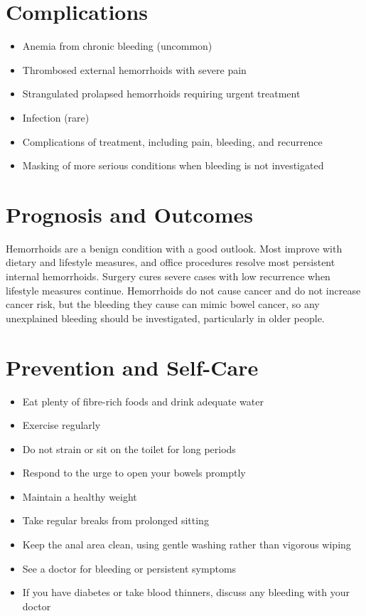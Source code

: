 \section*{Complications}
\begin{itemize}
    \item Anemia from chronic bleeding (uncommon)
    \item Thrombosed external hemorrhoids with severe pain
    \item Strangulated prolapsed hemorrhoids requiring urgent treatment
    \item Infection (rare)
    \item Complications of treatment, including pain, bleeding, and recurrence
    \item Masking of more serious conditions when bleeding is not investigated
\end{itemize}

\section*{Prognosis and Outcomes}
Hemorrhoids are a benign condition with a good outlook. Most improve with dietary and lifestyle measures, and office procedures resolve most persistent internal hemorrhoids. Surgery cures severe cases with low recurrence when lifestyle measures continue. Hemorrhoids do not cause cancer and do not increase cancer risk, but the bleeding they cause can mimic bowel cancer, so any unexplained bleeding should be investigated, particularly in older people.

\section*{Prevention and Self-Care}
\begin{itemize}
    \item Eat plenty of fibre-rich foods and drink adequate water
    \item Exercise regularly
    \item Do not strain or sit on the toilet for long periods
    \item Respond to the urge to open your bowels promptly
    \item Maintain a healthy weight
    \item Take regular breaks from prolonged sitting
    \item Keep the anal area clean, using gentle washing rather than vigorous wiping
    \item See a doctor for bleeding or persistent symptoms
    \item If you have diabetes or take blood thinners, discuss any bleeding with your doctor
\end{itemize}

